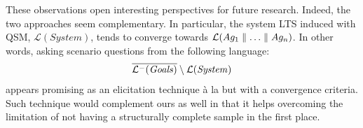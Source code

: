 These observations open interesting perspectives for future research. Indeed, the two approaches seem complementary. In particular, the system LTS induced with QSM, $\mathcal{L}(System)$, tends to converge towards $\mathcal{L}(Ag_1 \parallel \ldots \parallel Ag_n)$. In other words, asking scenario questions from the following language:
\begin{align*}
\overline{\mathcal{L}^-(\mbox{\emph{Goals}})} \setminus \mathcal{L}(\mbox{\emph{System}})
\end{align*}
appears promising as an elicitation technique \`a la \cite{Uchitel:2007, Uchitel:2009} but with a convergence criteria. Such technique would complement ours as well in that it helps overcoming the limitation of not having a structurally complete sample in the first place.

